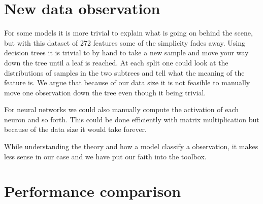 \section{New data observation}
For some models it is more trivial to explain what is going on behind the scene, but with this dataset of 272 features some of the simplicity fades away. Using decision trees it is trivial to by hand to take a new sample and move your way down the tree until a leaf is reached. At each split one could look at the distributions of samples in the two subtrees and tell what the meaning of the feature is. We argue that because of our data size it is not feasible to manually move one observation down the tree even though it being trivial. 

For neural networks we could also manually compute the activation of each neuron and so forth. This could be done efficiently with matrix multiplication but because of the data size it would take forever. 

While understanding the theory and how a model classify a observation, it makes less sense in our case and we have put our faith into the toolbox. 

\section{Performance comparison}
